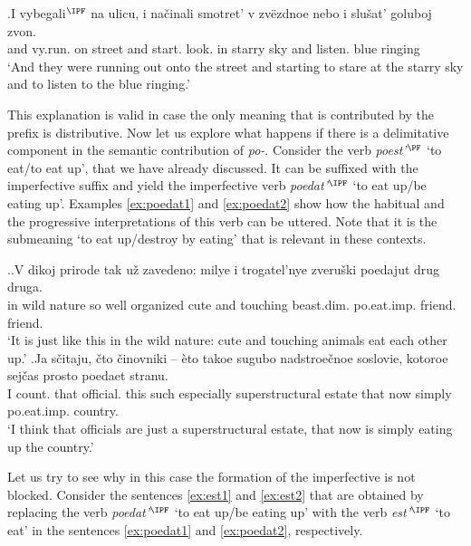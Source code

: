\exg.\label{ex:vybegat}I vybegali$^{\IPF}$ na ulicu, i na\v{c}inali smotret' v zv\"{e}zdnoe nebo i slu\v{s}at' goluboj zvon.\\
and vy.run. on street and start. look. in starry sky and listen. blue ringing\\
\trans `And they were running out onto the street and starting to stare at the starry sky and to listen to the blue ringing.'

This explanation is valid in case the only meaning that is contributed by the prefix is distributive. Now let us explore what happens if there is a delimitative component in the semantic contribution of \textit{po-}. Consider the verb \textit{poest'}$^{\PF}$ `to eat/to eat up', that we have already discussed. It can be suffixed with the imperfective suffix and yield the imperfective verb \textit{poedat'}$^{\IPF}$ `to eat up/be eating up'. Examples \ref{ex:poedat1} and \ref{ex:poedat2} show how the habitual and the progressive interpretations of this verb can be uttered. Note that it is the submeaning `to eat up/destroy by eating' that is relevant in these contexts.

\ex.\ag.\label{ex:poedat1}V dikoj prirode tak u\v{z} zavedeno: milye i trogatel'nye zveru\v{s}ki poedajut drug druga.\\
in wild nature so well organized cute and touching beast.dim. po.eat.imp. friend. friend.\\
\trans `It is just like this in the wild nature: cute and touching animals eat each other up.'
\bg.\label{ex:poedat2}Ja s\v{c}itaju, \v{c}to \v{c}inovniki -- \`{e}to takoe sugubo nadstroe\v{c}noe soslovie, kotoroe sej\v{c}as prosto poedaet stranu.\\
I count. that official. {} this such especially superstructural estate that now simply po.eat.imp. country.\\
\trans `I think that officials are just a superstructural estate, that now is simply eating up the country.'\\

Let us try to see why in this case the formation of the imperfective is not blocked. Consider the sentences \ref{ex:est1} and \ref{ex:est2} that are obtained by replacing the verb \textit{poedat'}$^{\IPF}$ `to eat up/be eating up' with the verb \textit{est'}$^{\IPF}$ `to eat' in the sentences \ref{ex:poedat1} and \ref{ex:poedat2}, respectively.
 
